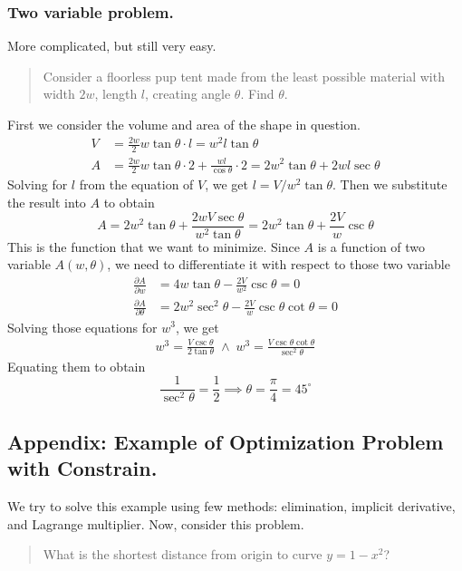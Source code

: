 \documentclass[../main.tex]{subfiles}
\begin{document}
\subsubsection*{Two variable problem.} More complicated, but still very easy.
\begin{quotation}
    Consider a floorless pup tent made from the least possible material with width $2w$, length $l$, creating angle $\theta$. Find $\theta$.
\end{quotation}

First we consider the volume and area of the shape in question.
\begin{align*}
    V&=\frac{2w}{2}w\tan \theta\cdot l=w^2l\tan\theta\\
    A&=\frac{2w}{2}w\tan \theta\cdot 2+\frac{wl}{\cos \theta}\cdot 2= 2w^2\tan\theta+2wl\sec \theta
\end{align*}
Solving for $l$ from the equation of $V$, we get $l=V/w^2\tan \theta$. Then we substitute the result into $A$ to obtain
\begin{equation*}
    A=2w^2\tan\theta+\frac{2wV\sec \theta}{w^2\tan\theta}= 2w^2\tan\theta+\frac{2V}{w}\csc\theta
\end{equation*}
This is the function that we want to minimize. Since $A$ is a function of two variable $A(w,\theta)$, we need to differentiate it with respect to those two variable
\begin{align*}
    \frac{\partial A}{\partial w}&=4w\tan \theta-\frac{2V}{w^2}\csc \theta=0\\
    \frac{\partial A}{\partial \theta}&=2w^2\sec^2\theta-\frac{2V}{w}\csc\theta\cot\theta=0
\end{align*}
Solving those equations for $w^3$, we get
\begin{align*}
    w^3=\frac{V\csc\theta}{2\tan\theta}\;\land\; w^3=\frac{V\csc\theta\cot\theta}{\sec^2\theta}
\end{align*}
Equating them to obtain
\begin{equation*}
    \frac{1}{\sec^2\theta}=\frac{1}{2}\implies \theta=\frac{\pi}{4}=45^\circ 
\end{equation*}

\subsection*{Appendix: Example of Optimization Problem with Constrain.} 
We try to solve this example using few methods: elimination, implicit derivative, and Lagrange multiplier. Now, consider this problem.
\begin{quotation}
    What is the shortest distance from origin to curve $y=1-x^2$?
\end{quotation} 
\end{document}
